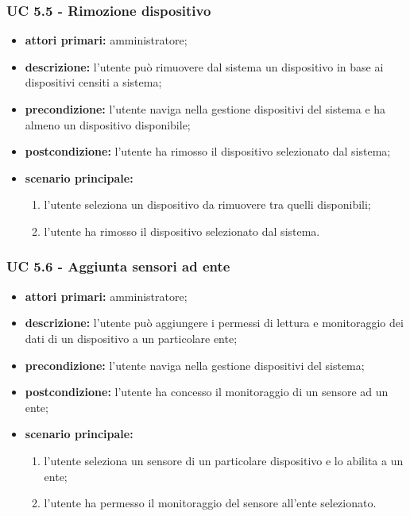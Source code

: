 			\subsubsection{UC 5.5 - Rimozione dispositivo}
			\begin{itemize}
				\item \textbf{attori primari:} amministratore;
				\item \textbf{descrizione:} l'utente può rimuovere dal sistema un dispositivo in base ai dispositivi censiti a sistema;
				\item \textbf{precondizione:} l'utente naviga nella gestione dispositivi del sistema e ha almeno un dispositivo disponibile;
				\item \textbf{postcondizione:} l'utente ha rimosso il dispositivo selezionato dal sistema;
				\item \textbf{scenario principale:}
				\begin{enumerate}
					\item{l'utente seleziona un dispositivo da rimuovere tra quelli disponibili;}
					\item{l'utente ha rimosso il dispositivo selezionato dal sistema.}
				\end{enumerate}
			\end{itemize}

			\subsubsection{UC 5.6 - Aggiunta sensori ad ente}
			\begin{itemize}
				\item \textbf{attori primari:} amministratore;
				\item \textbf{descrizione:} l'utente può aggiungere i permessi di lettura e monitoraggio dei dati di un dispositivo a un particolare ente;
				\item \textbf{precondizione:} l'utente naviga nella gestione dispositivi del sistema;
				\item \textbf{postcondizione:} l'utente ha concesso il monitoraggio di un sensore ad un ente;
				\item \textbf{scenario principale:}
				\begin{enumerate}
					\item{l'utente seleziona un sensore di un particolare dispositivo e lo abilita a un ente;}
					\item{l'utente ha permesso il monitoraggio del sensore all'ente selezionato.}
				\end{enumerate}
			\end{itemize}

